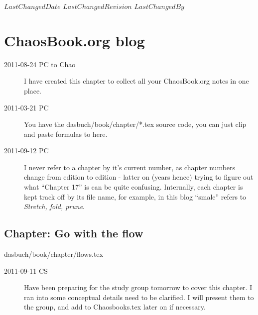\ifsvnmulti
{}
{$LastChangedDate$}
{$LastChangedRevision$} {$LastChangedBy$}
\fi


\chapter{ChaosBook.org blog}
\label{chap:ChaosBook}

\begin{description}

\item[2011-08-24 PC to Chao]
I have created this chapter to collect all your ChaosBook.org
notes in one place.


\item[2011-03-21 PC] You have the dasbuch/book/chapter/*.tex source
code, you can just clip and paste formulas to here.

\item[2011-09-12 PC] I never refer to a chapter by it's current number,
as chapter numbers change from edition to edition - latter on (years
hence) trying to figure out what ``Chapter 17'' is can be quite
confusing. Internally, each chapter is kept track off by its file name,
for example, in this blog ``smale'' refers to   {\em
Stretch, fold, prune}.

\end{description}


\section{Chapter: Go with the flow}
\label{c-flows}\noindent dasbuch/book/chapter/flows.tex

\begin{description}

\item[2011-09-11 CS]
Have been preparing for the study group tomorrow to cover this chapter. I
ran into some conceptual details need to be clarified. I will present
them to the group, and add to Chaosbooks.tex later on if necessary.



\end{description}


